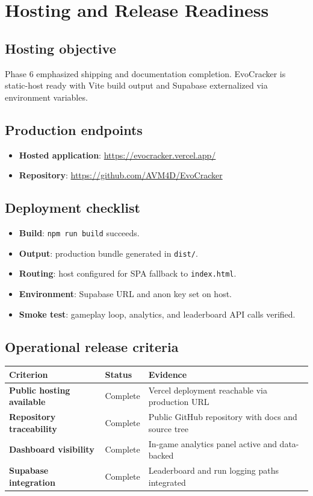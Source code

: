 \documentclass[11pt,a4paper,twoside]{article}
\begin{document}
\section{Hosting and Release Readiness}
\label{sec:hosting}

\subsection{Hosting objective}
Phase 6 emphasized shipping and documentation completion. EvoCracker is static-host ready with Vite build output and Supabase externalized via environment variables.

\subsection{Production endpoints}
\begin{itemize}[leftmargin=6mm]
  \item \textbf{Hosted application}: \url{https://evocracker.vercel.app/}
  \item \textbf{Repository}: \url{https://github.com/AVM4D/EvoCracker}
\end{itemize}

\subsection{Deployment checklist}
\begin{itemize}[leftmargin=6mm]
  \item \textbf{Build}: \texttt{npm run build} succeeds.
  \item \textbf{Output}: production bundle generated in \texttt{dist/}.
  \item \textbf{Routing}: host configured for SPA fallback to \texttt{index.html}.
  \item \textbf{Environment}: Supabase URL and anon key set on host.
  \item \textbf{Smoke test}: gameplay loop, analytics, and leaderboard API calls verified.
\end{itemize}

\subsection{Operational release criteria}
\begin{center}
\begin{tabular}{>{\bfseries}p{4.1cm} p{3.2cm} p{4.7cm}}
\toprule
Criterion & Status & Evidence \\
\midrule
Public hosting available & Complete & Vercel deployment reachable via production URL \\
Repository traceability & Complete & Public GitHub repository with docs and source tree \\
Dashboard visibility & Complete & In-game analytics panel active and data-backed \\
Supabase integration & Complete & Leaderboard and run logging paths integrated \\
\bottomrule
\end{tabular}
\end{center}
\end{document}

